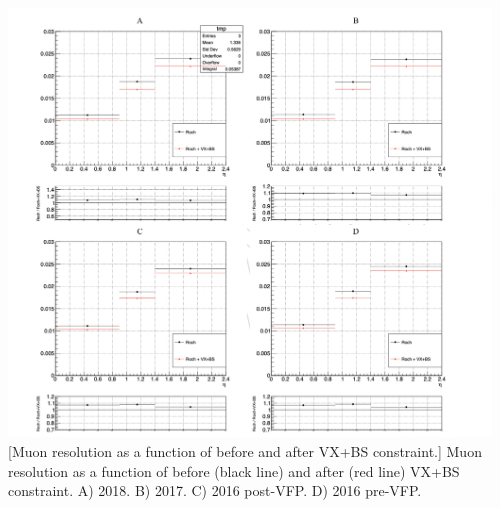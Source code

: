\begin{multiFigure}
\begin{center}
	\includegraphics[width=0.96\textwidth]{figures/higgsmassmeas/vxbs/vxbs_muon_pTresol_vs_eta.png}
    [Muon \pT resolution as a function of \abseta before and after VX+BS constraint.]
    {Muon \pT resolution as a function of \abseta before (black line) and after (red line) VX+BS constraint.
    \;A) 2018.
    \;B) 2017.
    \;C) 2016 post-VFP.
    \;D) 2016 pre-VFP.
    } %
\label{fig:Resolution_eta}
\end{center}
\end{multiFigure}

